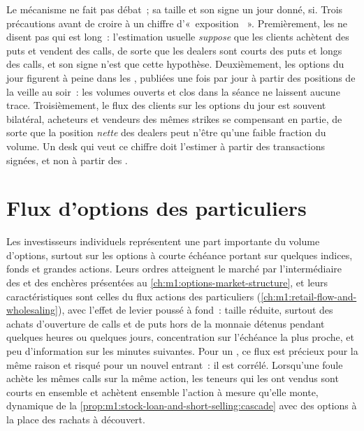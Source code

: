 Le mécanisme ne fait pas débat~; sa taille et son signe un jour donné, si. Trois
précautions avant de croire à un chiffre d'«~exposition ~». Premièrement, les
 ne disent pas qui est long~: l'estimation usuelle \emph{suppose} que les
clients achètent des puts et vendent des calls, de sorte que les dealers sont courts des puts
et longs des calls, et son signe n'est que cette hypothèse. Deuxièmement, les options du
jour figurent à peine dans les , publiées une fois par jour à partir des
positions de la veille au soir~: les volumes ouverts et clos dans la séance ne laissent
aucune trace. Troisièmement, le flux des clients sur les options du jour est souvent
bilatéral, acheteurs et vendeurs des mêmes strikes se compensant en partie, de sorte que la
position \emph{nette} des dealers peut n'être qu'une faible fraction du volume. Un desk qui
veut ce chiffre doit l'estimer à partir des transactions signées, et non à partir des
.

\section{Flux d'options des particuliers}

Les investisseurs individuels représentent une part importante du volume d'options,
surtout sur les options à courte échéance portant sur quelques indices, fonds et grandes
actions. Leurs ordres atteignent le marché par l'intermédiaire des  et des
enchères présentées au \cref{ch:m1:options-market-structure}, et leurs caractéristiques sont
celles du flux actions des particuliers (\cref{ch:m1:retail-flow-and-wholesaling}), avec l'effet de
levier poussé à fond~: taille réduite, surtout des achats d'ouverture de calls et de puts hors
de la monnaie détenus pendant quelques heures ou quelques jours, concentration sur l'échéance
la plus proche, et peu d'information sur les minutes suivantes. Pour un , ce
flux est précieux pour la même raison et risqué pour un nouvel entrant~: il est corrélé.
Lorsqu'une foule achète les mêmes calls sur la même action, les teneurs qui les ont vendus
sont courts en  ensemble et achètent ensemble l'action à mesure qu'elle monte, dynamique
de la \cref{prop:m1:stock-loan-and-short-selling:cascade} avec des options à la place des
rachats
à découvert.

